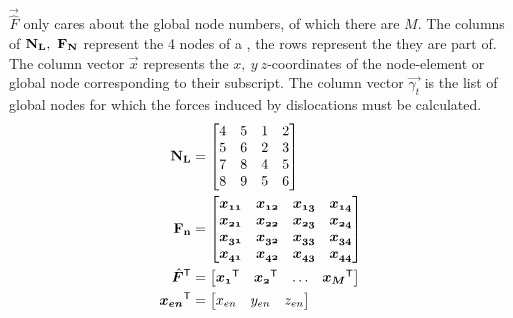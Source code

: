 	$ \vec{\hat{F}} $ only cares about the global node numbers, of which there are $ M $. The columns of $ \mathbf{N_{L}},~ \mathbf{F_{N}} $ represent the 4 nodes of a , the rows represent the  they are part of. The column vector $ \vec{x} $ represents the $ x,~y~z $-coordinates of the node-element or global node corresponding to their subscript. The column vector $ \vec{\gamma_{t}} $ is the list of global nodes for which the forces induced by dislocations must be calculated.
	\begin{align}
		\mtx{N_{L}} &=	\begin{bmatrix}
							4 & 5 & 1 & 2\\
							5 & 6 & 2 & 3\\
							7 & 8 & 4 & 5\\
							8 & 9 & 5 & 6\\
						\end{bmatrix}\\
		\mtx{F_{n}} &=	\begin{bmatrix}
							\vec{x_{11}} & \vec{x_{12}} & \vec{x_{13}} & \vec{x_{14}}\\
							\vec{x_{21}} & \vec{x_{22}} & \vec{x_{23}} & \vec{x_{24}}\\
							\vec{x_{31}} & \vec{x_{32}} & \vec{x_{33}} & \vec{x_{34}}\\
							\vec{x_{41}} & \vec{x_{42}} & \vec{x_{43}} & \vec{x_{44}}\\
						\end{bmatrix}\\
		\vec{\hat{F}}^{\mathsf{T}} &= 	\begin{bmatrix}
											\vec{x_{1}}^{\mathsf{T}} & \vec{x_{2}}^{\mathsf{T}} & \ldots & \vec{x_{M}}^{\mathsf{T}}
										\end{bmatrix}\\
		\vec{x_{en}}^{\mathsf{T}} &=	\begin{bmatrix}
											x_{en} & y_{en} & z_{en}
										\end{bmatrix}
	\end{align}
		
		